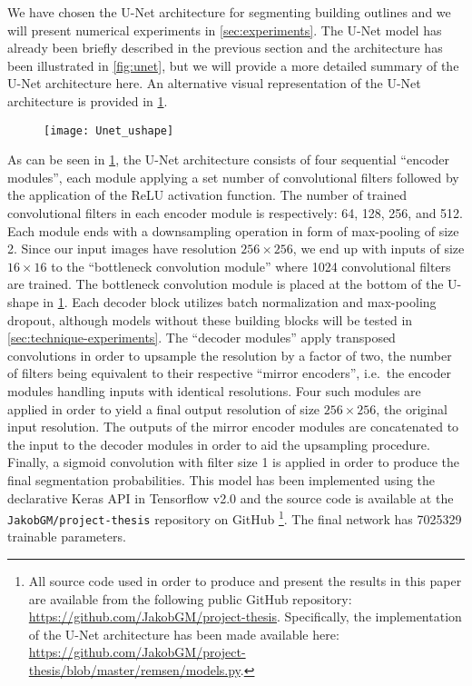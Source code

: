 We have chosen the U-Net architecture for segmenting building outlines and we will present numerical experiments in \cref{sec:experiments}.
The U-Net model has already been briefly described in the previous section and the architecture has been illustrated in \cref{fig:unet}, but we will provide a more detailed summary of the U-Net architecture here.
An alternative visual representation of the U-Net architecture is provided in \cref{fig:unet2}.

\begin{figure}[H]
  \centering
  \texttt{[image: Unet\_ushape]}
  \label{fig:unet2}
\end{figure}

As can be seen in \cref{fig:unet2}, the U-Net architecture consists of four sequential \enquote{encoder modules}, each module applying a set number of convolutional filters followed by the application of the ReLU activation function.
The number of trained convolutional filters in each encoder module is respectively: 64, 128, 256, and 512.
Each module ends with a downsampling operation in form of max-pooling of size 2.
Since our input images have resolution $256 \times 256$, we end up with inputs of size $16 \times 16$ to the \enquote{bottleneck convolution module} where 1024 convolutional filters are trained.
The bottleneck convolution module is placed at the bottom of the U-shape in \cref{fig:unet2}.
Each decoder block utilizes batch normalization and max-pooling dropout, although models without these building blocks will be tested in \cref{sec:technique-experiments}.
The \enquote{decoder modules} apply transposed convolutions in order to upsample the resolution by a factor of two, the number of filters being equivalent to their respective \enquote{mirror encoders}, i.e.\ the encoder modules handling inputs with identical resolutions.
Four such modules are applied in order to yield a final output resolution of size $256 \times 256$, the original input resolution.
The outputs of the mirror encoder modules are concatenated to the input to the decoder modules in order to aid the upsampling procedure.
Finally, a sigmoid convolution with filter size \num{1} is applied in order to produce the final segmentation probabilities.
This model has been implemented using the declarative Keras API in Tensorflow v2.0 and the source code is available at the \texttt{JakobGM/project-thesis} repository on GitHub%
\footnote{%
  All source code used in order to produce and present the results in this paper are available from the following public GitHub repository: \url{https://github.com/JakobGM/project-thesis}.
  Specifically, the implementation of the U-Net architecture has been made available here: \url{https://github.com/JakobGM/project-thesis/blob/master/remsen/models.py}.
}.
The final network has \num{7025329} trainable parameters.
